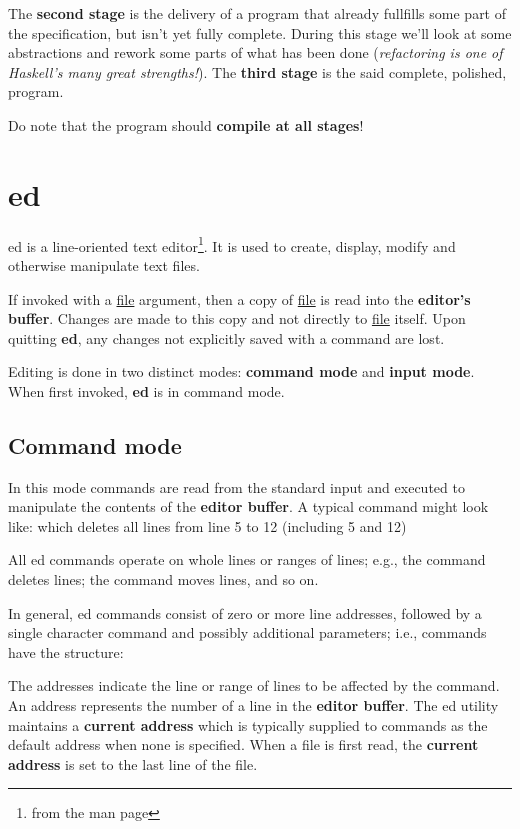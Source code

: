 \documentclass[a4paper,10pt]{article}
\newcommand{\Varid}[1]{\mathit{#1}}
\def\resethooks{%
  \global\let\SaveRestoreHook\empty
  \global\let\ColumnHook\empty}
\let\hspre\empty
\let\hspost\empty
\renewcommand{\Varid}[1]{\textcolor{black}{\textit{#1}}}
\begin{document}
The \textbf{second stage} is the delivery of a program that already fullfills
some part of the specification, but isn't yet fully complete. During this stage
we'll look at some abstractions and rework some parts of what has been done
(\emph{refactoring is one of Haskell's many great strengths!}). The
\textbf{third stage} is the said complete, polished, program.

Do note that the program should \textbf{compile at all stages}!

\section{ed}\label{sec:ed}

ed is a line-oriented text editor\footnote{from the man page}. It is
used to create, display, modify and otherwise manipulate text files.

If invoked with a \underline{file} argument, then a copy of \underline{file} is
read into the \textbf{editor's buffer}. Changes are made to this copy and not
directly to \underline{file} itself. Upon quitting \textbf{ed}, any changes not
explicitly saved with a  command are lost.

Editing is done in two distinct modes: \textbf{command mode} and \textbf{input mode}. When
first invoked, \textbf{ed} is in command mode.

\subsection{Command mode}\label{sec:command}

In this mode commands are read from the standard input and executed to
manipulate the contents of the \textbf{editor buffer}. A typical command might look
like: \underline{} which deletes all lines from line 5 to 12 (including 5 and 12)

All ed commands operate on whole lines or ranges of lines; e.g., the 
command deletes lines; the  command moves lines, and so on.

In general, ed commands consist of zero or more line addresses, followed by a
single character command and possibly additional parameters; i.e., commands
have the structure:
\resethooks
The addresses indicate the line or range of lines to be affected by the
command. An address represents the number of a line in the \textbf{editor
buffer}. The ed utility maintains a \textbf{current address} which is typically supplied
to commands as the default address when none is specified.  When a file is
first read, the \textbf{current address} is set to the last line of the file.
\end{document}
